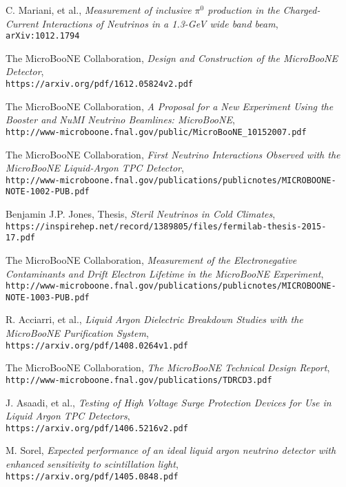 \documentclass[12pt]{article}
\begin{document}
\begin{thebibliography}{20}
  C. Mariani, et al., \emph{Measurement of inclusive $\pi^0$ production in the Charged-Current Interactions of Neutrinos in a 1.3-GeV wide band beam},\\
  \texttt{arXiv:1012.1794}

  The MicroBooNE Collaboration, \emph{Design and Construction of the MicroBooNE Detector},\\
  \texttt{https://arxiv.org/pdf/1612.05824v2.pdf}

  The MicroBooNE Collaboration, \emph{A Proposal for a New Experiment Using the Booster and NuMI Neutrino Beamlines: MicroBooNE},\\
  \texttt{http://www-microboone.fnal.gov/public/MicroBooNE\_10152007.pdf}

  The MicroBooNE Collaboration, \emph{First Neutrino Interactions Observed with the MicroBooNE Liquid-Argon TPC Detector},\\
  \texttt{http://www-microboone.fnal.gov/publications/publicnotes/MICROBOONE-NOTE-1002-PUB.pdf}

  Benjamin J.P. Jones, Thesis, \emph{Steril Neutrinos in Cold Climates},\\
  \texttt{https://inspirehep.net/record/1389805/files/fermilab-thesis-2015-17.pdf}

  The MicroBooNE Collaboration, \emph{Measurement of the Electronegative Contaminants and Drift Electron Lifetime in the MicroBooNE Experiment},\\
  \texttt{http://www-microboone.fnal.gov/publications/publicnotes/MICROBOONE-NOTE-1003-PUB.pdf}

  R. Acciarri, et al., \emph{Liquid Argon Dielectric Breakdown Studies with the MicroBooNE Purification System}, \\
  \texttt{https://arxiv.org/pdf/1408.0264v1.pdf}

  The MicroBooNE Collaboration, \emph{The MicroBooNE Technical Design Report}, \\
  \texttt{http://www-microboone.fnal.gov/publications/TDRCD3.pdf}

  J. Asaadi, et al., \emph{Testing of High Voltage Surge Protection Devices for Use in Liquid Argon TPC Detectors}, \\
  \texttt{https://arxiv.org/pdf/1406.5216v2.pdf}

  M. Sorel, \emph{Expected performance of an ideal liquid argon neutrino detector with enhanced sensitivity to scintillation light}, \\
  \texttt{https://arxiv.org/pdf/1405.0848.pdf}


\end{thebibliography}
\end{document}
